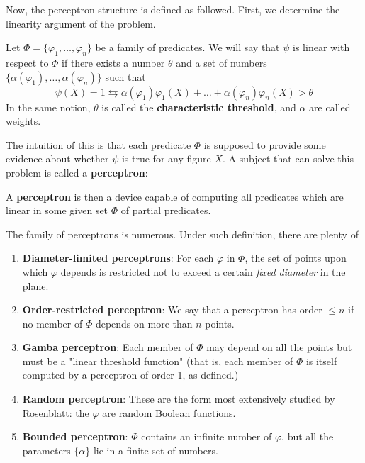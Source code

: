 Now, the perceptron structure is defined as followed. First, we determine the linearity argument of the problem. 
\begin{definition}
    Let $\Phi = \{\varphi_{1},\dots,\varphi_{n}\}$ be a family of predicates. We will say that $\psi$ is linear with respect to $\Phi$ if there exists a number $\theta$ and a set of numbers $\{\alpha(\varphi_{1}),\dots,\alpha(\varphi_{n})\}$ such that \begin{equation}
        \psi(X) = 1 \leftrightarrows \alpha(\varphi_{1})\varphi_{1}(X) + \dots + \alpha(\varphi_{n}) \varphi_{n}(X) > \theta
    \end{equation} 
    In the same notion, $\theta$ is called the \textbf{characteristic threshold}, and $\alpha$ are called weights. 
\end{definition}
The intuition of this is that each predicate $\Phi$ is supposed to provide some evidence about whether $\psi$ is true for any figure $X$. A subject that can solve this problem is called a \textbf{perceptron}: 
\begin{definition}
    A \textbf{perceptron} is then a device capable of computing all predicates which are linear in some given set $\Phi$ of partial predicates. 
\end{definition}
The family of perceptrons is numerous. Under such definition, there are plenty of
\begin{enumerate}[noitemsep]
    \item \textbf{Diameter-limited perceptrons}: For each $\varphi$ in $\Phi$, the set of points upon which $\varphi$ depends is restricted not to exceed a certain \textit{fixed diameter} in the plane. 
    \item \textbf{Order-restricted perceptron}: We say that a perceptron has order $\leq n$ if no member of $\Phi$ depends on more than $n$ points. 
    \item \textbf{Gamba perceptron}: Each member of $\Phi$ may depend on all the points but must be a "linear threshold function" (that is, each member of $\Phi$ is itself computed by a perceptron of order 1, as defined.) 
    \item \textbf{Random perceptron}: These are the form most extensively studied by Rosenblatt: the $\varphi$ are random Boolean functions. 
    \item \textbf{Bounded perceptron}: $\Phi$ contains an infinite number of $\varphi$, but all the parameters $\{\alpha\}$ lie in a finite set of numbers. 
\end{enumerate} 
